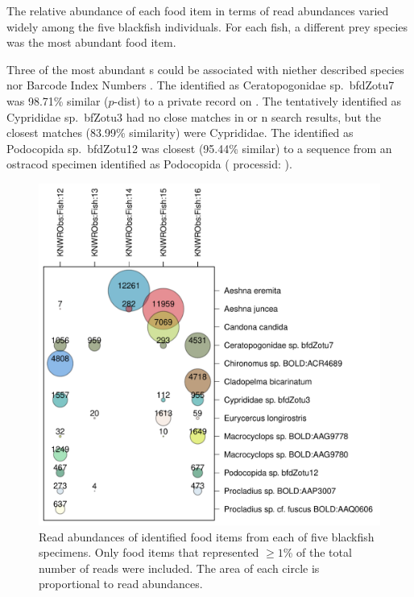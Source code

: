 \begin{multicols}{2}
The relative abundance of each food item in terms of read abundances varied widely among the five blackfish individuals. For each fish, a different prey species was the most abundant food item.

Three of the most abundant s could be associated with niether described species nor  Barcode Index Numbers \citep{Ratnasinghametal2013}.  The  identified as Ceratopogonidae sp.\ bfdZotu7 was 98.71\% similar ($p$-dist) to a private record on . The  tentatively identified as Cyprididae sp.\ bfZotu3 had no close matches in  or n search results, but the closest matches (83.99\% similarity) were Cyprididae. The  identified as Podocopida sp.\ bfdZotu12 was closest (95.44\% similar) to a sequence from an ostracod specimen identified as Podocopida ( processid: ).

\end{multicols}
\begin{figure}[H]
\begin{center}
\includegraphics[width=13cm]{img/blackfish_diet_items.pdf}
\caption{Read abundances of identified food items from each of five blackfish specimens. Only food items that represented $\geq 1$\% of the total number of reads were included. The area of each circle is proportional to read abundances.}
\label{blackfish_diet_items}
\end{center}
\end{figure} 
